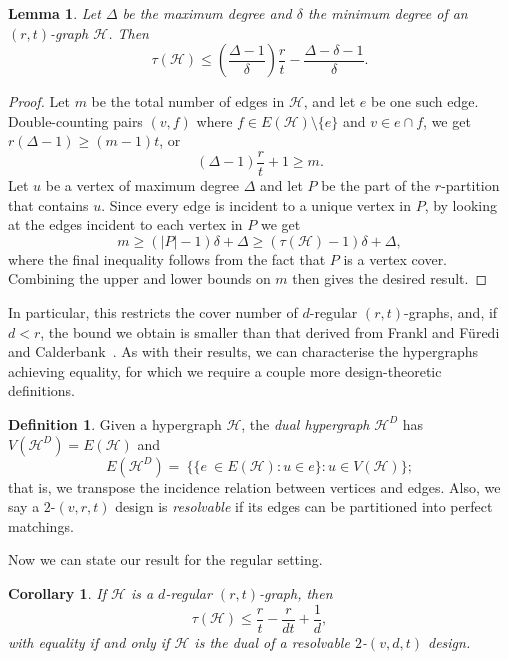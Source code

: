 \documentclass[a4paper,twoside,11pt]{article}
\newtheorem{lem}[thm]{Lemma}
\newtheorem{cor}[thm]{Corollary}
\numberwithin{thm}{section}
\theoremstyle{definition}
\newtheorem{dfn}[thm]{Definition}
\theoremstyle{remark}
\theoremstyle{definition}
\newcommand{\mc}[1]{\mathcal{#1}}
\newcommand{\m}[1]{\mathcal{#1}}
\begin{document}
\begin{lem}
\label{lem:rtd_counting}
Let $\Delta$ be the maximum degree and $\delta$ the minimum degree of an $(r, t)$-graph $\m H$. 
Then 
\[\tau(\m H) \leq \left(\frac{\Delta - 1}{\delta}\right) \frac{r}{t} - \frac{\Delta - \delta - 1}{\delta}.\]
\end{lem}
\begin{proof}
Let $m$ be the total number of edges in $\mc H$, and let $e$ be one such edge. Double-counting pairs $(v, f)$ where $f \in E(\mc H) \setminus \{e\}$ and $v \in e \cap f$, we get $r(\Delta - 1) \geq (m - 1)t$, or
\begin{equation} \label{eqn:rtd_dblcount}
\left( \Delta - 1 \right) \frac{r}{t} + 1 \ge m .
\end{equation}
Let $u$ be a vertex of maximum degree $\Delta$ and let $P$ be the part of the $r$-partition that contains $u$. Since every edge is incident to a unique vertex in $P$, by looking at the edges incident to each vertex in $P$ we get 
\begin{equation} \label{eqn:rtd_partbound}
m \geq (|P| - 1) \delta + \Delta \ge ( \tau( \m H) - 1) \delta + \Delta,
\end{equation}
where the final inequality follows from the fact that $P$ is a vertex cover. Combining the upper and lower bounds on $m$ then gives the desired result. 
\end{proof}

In particular, this restricts the cover number of $d$-regular $(r,t)$-graphs, and, if $d < r$, the bound we obtain is smaller than that derived from Frankl and F\"uredi~\cite{frafur86} and Calderbank~\cite{calderbank87}. As with their results, we can characterise the hypergraphs achieving equality, for which we require a couple more design-theoretic definitions.

\begin{dfn} \label{def:dual_resolvable}
Given a hypergraph $\m H$, the \emph{dual hypergraph} $\m H^D$ has $V(\m H^D) = E(\m H)$ and \[E(\m H^D) =~\{ \{ e~\in E(\m H) : u \in e \} : u \in V(\m H) \};\] that is, we transpose the incidence relation between vertices and edges. Also, we say a $2$-$(v,r,t)$ design is \emph{resolvable} if its edges can be partitioned into perfect matchings.
\end{dfn}

Now we can state our result for the regular setting.

\begin{cor} \label{cor:regular}
If $\m H$ is a $d$-regular $(r,t)$-graph, then
\[ \tau(\m H) \le \frac{r}{t} - \frac{r}{dt} + \frac{1}{d}, \]
with equality if and only if $\m H$ is the dual of a resolvable $2$-$(v,d,t)$ design.
\end{cor}
\end{document}
